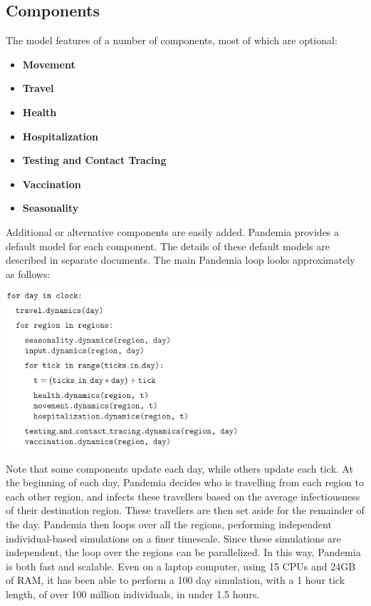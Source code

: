 \documentclass[10pt,letterpaper]{article}
\begin{document}
\subsection*{Components}
The model features of a number of components, most of which are optional:
\begin{itemize}
\item \textbf{Movement}
\item \textbf{Travel}
\item \textbf{Health}
\item \textbf{Hospitalization}
\item \textbf{Testing and Contact Tracing}
\item \textbf{Vaccination}
\item \textbf{Seasonality}
\end{itemize}
Additional or alternative components are easily added. Pandemia provides a default model for each component. The details of these default models are described in separate documents. The main Pandemia loop looks approximately as follows:
\begin{center}
\includegraphics[width=0.65\textwidth]{psuedo}
\end{center}
Note that some components update each day, while others update each tick. At the beginning of each day, Pandemia decides who is travelling from each region to each other region, and infects these travellers based on the average infectiousness of their destination region. These travellers are then set aside for the remainder of the day. Pandemia then loops over all the regions, performing independent individual-based simulations on a finer timescale. Since these simulations are independent, the loop over the regions can be parallelized. In this way, Pandemia is both fast and scalable. Even on a laptop computer, using 15 CPUs and 24GB of RAM, it has been able to perform a 100 day simulation, with a 1 hour tick length, of over 100 million individuals, in under 1.5 hours.
\end{document}
